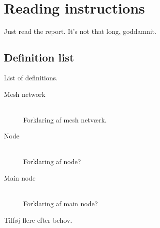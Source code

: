 \chapter{Reading instructions}

Just read the report. It's not that long, goddamnit.

\section*{Definition list}
List of definitions.

\begin{description}
\item[Mesh network] \hfill \\
Forklaring af mesh netværk.
\item[Node] \hfill \\
Forklaring af node?
\item[Main node] \hfill \\
Forklaring af main node?
\end{description}

Tilføj flere efter behov.